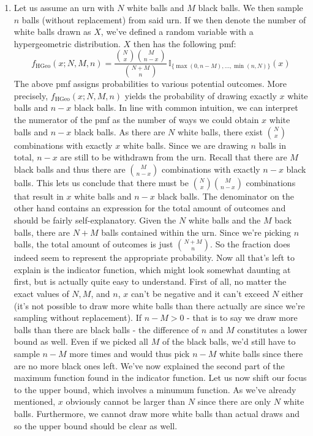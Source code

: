 \documentclass[12pt]{article}
\begin{document}
\begin{enumerate}
\begin{enumerate}
\item
Let us assume an urn with $N$ white balls and $M$ black balls. We then sample $n$ balls (without replacement) from said urn. If we then denote the number of white balls drawn as $X$, we've defined a random variable with a hypergeometric distribution. $X$ then has the following pmf:
\begin{equation*}
f_{\text{HGeo}}(x; N, M, n) = \dfrac{\binom{N}{x} \binom{M}{n-x}}{\binom{N+M}{n}} \, \mathbb{I}_{\{\max(0, n-M), \ldots, \min(n, N)\}}(x)
\end{equation*}
The above pmf assigns probabilities to various potential outcomes. More precisely, $f_{\text{HGeo}}(x; N, M, n)$ yields the probability of drawing exactly $x$ white balls and $n-x$ black balls. In line with common intuition, we can interpret the numerator of the pmf as the number of ways we could obtain $x$ white balls and $n-x$ black balls. As there are $N$ white balls, there exist $\binom{N}{x}$ combinations with exactly $x$ white balls. Since we are drawing $n$ balls in total, $n-x$ are still to be withdrawn from the urn. Recall that there are $M$ black balls and thus there are $\binom{M}{n-x}$ combinations with exactly $n-x$ black balls. This lets us conclude that there must be $\binom{N}{x}\binom{M}{n-x}$ combinations that result in $x$ white balls and $n-x$ black balls.
The denominator on the other hand contains an expression for the total amount of outcomes and should be fairly self-explanatory. Given the $N$ white balls and the $M$ back balls, there are $N+M$ balls contained within the urn. Since we're picking $n$ balls, the total amount of outcomes is just $\binom{N+M}{n}$. So the fraction does indeed seem to represent the appropriate probability.
Now all that's left to explain is the indicator function, which might look somewhat daunting at first, but is actually quite easy to understand. First of all, no matter the exact values of $N,M$, and $n$, $x$ can't be negative and it can't exceed $N$ either (it's not possible to draw more white balls than there actually are since we're sampling without replacement). If $n-M > 0$ - that is to say we draw more balls than there are black balls - the difference of $n$ and $M$ constitutes a lower bound as well. Even if we picked all $M$ of the black balls, we'd still have to sample $n-M$ more times and would thus pick $n-M$ white balls since there are no more black ones left. We've now explained the second part of the maximum function found in the indicator function. Let us now shift our focus to the upper bound, which involves a minumum function. As we've already mentioned, $x$ obviously cannot be larger than $N$ since there are only $N$ white balls. Furthermore, we cannot draw more white balls than actual draws and so the upper bound should be clear as well. \\

\end{enumerate}
\end{enumerate}
\end{document}

